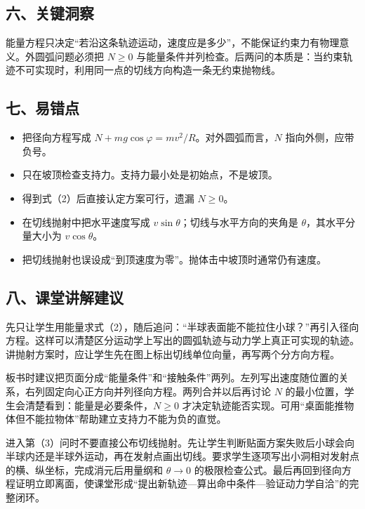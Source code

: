 \documentclass[12pt,a4paper,UTF8]{ctexart}
\newcommand{\tightlist}{\setlength{\itemsep}{0pt}\setlength{\parskip}{0pt}}
\begin{document}
\subsection{六、关键洞察}\label{ux516dux5173ux952eux6d1eux5bdf}

能量方程只决定``若沿这条轨迹运动，速度应是多少''，不能保证约束力有物理意义。外圆弧问题必须把
\(N\geq0\)
与能量条件并列检查。后两问的本质是：当约束轨迹不可实现时，利用同一点的切线方向构造一条无约束抛物线。

\subsection{七、易错点}\label{ux4e03ux6613ux9519ux70b9}

\begin{itemize}
\tightlist
\item
  把径向方程写成 \(N+mg\cos\varphi=mv^2/R\)。对外圆弧而言，\(N\)
  指向外侧，应带负号。
\item
  只在坡顶检查支持力。支持力最小处是初始点，不是坡顶。
\item
  得到式（2）后直接认定方案可行，遗漏 \(N\geq0\)。
\item
  在切线抛射中把水平速度写成 \(v\sin\theta\)；切线与水平方向的夹角是
  \(\theta\)，其水平分量大小为 \(v\cos\theta\)。
\item
  把切线抛射也误设成``到顶速度为零''。抛体击中坡顶时通常仍有速度。
\end{itemize}

\subsection{八、课堂讲解建议}\label{ux516bux8bfeux5802ux8bb2ux89e3ux5efaux8bae}

先只让学生用能量求式（2），随后追问：``半球表面能不能拉住小球？''再引入径向方程。这样可以清楚区分运动学上写出的圆弧轨迹与动力学上真正可实现的轨迹。讲抛射方案时，应让学生先在图上标出切线单位向量，再写两个分方向方程。

板书时建议把页面分成``能量条件''和``接触条件''两列。左列写出速度随位置的关系，右列固定向心正方向并列径向方程。两列合并以后再讨论
\(N\) 的最小位置，学生会清楚看到：能量是必要条件，\(N\geqslant0\)
才决定轨迹能否实现。可用``桌面能推物体但不能拉物体''帮助建立支持力不能为负的直觉。

进入第（3）问时不要直接公布切线抛射。先让学生判断贴面方案失败后小球会向半球内还是半球外运动，再在发射点画出切线。要求学生逐项写出小洞相对发射点的横、纵坐标，完成消元后用量纲和
\(\theta\to0\)
的极限检查公式。最后再回到径向方程证明立即离面，使课堂形成``提出新轨迹---算出命中条件---验证动力学自洽''的完整闭环。
\end{document}
